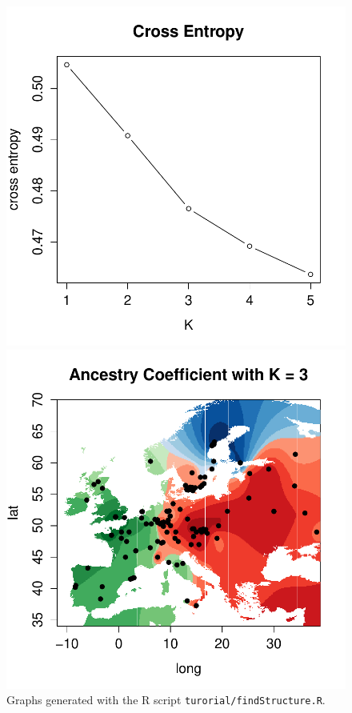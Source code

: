 \documentclass[10pt,a4paper]{article}
\begin{document}


\begin{figure}[h!]\centering
\begin{minipage}{0.49\textwidth}
\includegraphics[width=\linewidth]{crossEntropy.pdf}
\end{minipage}
\begin {minipage}{0.49\textwidth}
\includegraphics[width=\linewidth]{map.pdf}
\end{minipage}
\caption{Graphs generated with the R script {\tt turorial/findStructure.R}.}
\end{figure} 
\end{document}
